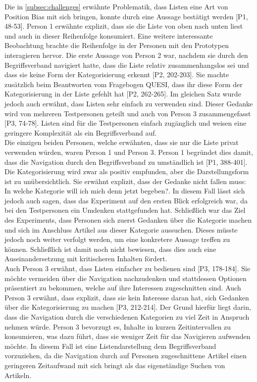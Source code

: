 Die in \autoref{subsec:challenges} erwähnte Problematik, dass Listen eine Art von Position Bias mit sich bringen, konnte durch eine Aussage bestätigt werden [P1, 48-53].
Person 1 erwähnte explizit, dass sie die Liste von oben nach unten liest und auch in dieser Reihenfolge konsumiert.
Eine weitere interessante Beobachtung brachte die Reihenfolge in der Personen mit den Prototypen interagieren hervor.
Die erste Aussage von Person 2 war, nachdem sie durch den Begriffsverband navigiert hatte, dass die Liste \glqq relativ zusammenhangslos\grqq{} sei und dass sie keine Form der Kategorisierung erkennt [P2, 202-203].
Sie machte zusätzlich beim Beantworten vom Fragebogen \ac{QUESI}, dass ihr diese Form der Kategorisierung in der Liste gefehlt hat [P2, 262-265].
Im gleichen Satz wurde jedoch auch erwähnt, dass Listen sehr einfach zu verwenden sind.
Dieser Gedanke wird von mehreren Testpersonen geteilt und auch von Person 3 zusammengefasst [P3, 74-78].
Listen sind für die Testpersonen einfach zugänglich und weisen eine geringere Komplexität als ein Begriffsverband auf.\\

Die einzigen beiden Personen, welche erwähnten, dass sie nur die Liste privat verwenden würden, waren Person 1 und Person 3.
Person 1 begründet dies damit, dass die Navigation durch den Begriffsverband zu umständlich ist [P1, 388-401].
Die Kategorisierung wird zwar als positiv empfunden, aber die Darstellungsform ist zu unübersichtlich.
Sie erwähnt explizit, dass der Gedanke nicht fallen muss: \glqq In welche Kategorie will ich mich denn jetzt begeben?\grqq{}.
In diesem Fall lässt sich jedoch auch sagen, dass das Experiment auf den ersten Blick erfolgreich war, da bei den Testpersonen ein Umdenken stattgefunden hat.
Schließlich war das Ziel des Experiments, dass Personen sich zuerst Gedanken über die Kategorie machen und sich im Anschluss Artikel aus dieser Kategorie aussuchen.
Dieses müsste jedoch noch weiter verfolgt werden, um eine konkretere Aussage treffen zu können.
Schließlich ist damit noch nicht bewiesen, dass dies auch eine Auseinandersetzung mit kritischeren Inhalten fördert.\\

Auch Person 3 erwähnt, dass Listen einfacher zu bedienen sind [P3, 178-184].
Sie möchte vermeiden über die Navigation nachzudenken und stattdessen Optionen präsentiert zu bekommen, welche auf ihre Interessen zugeschnitten sind.
Auch Person 3 erwähnt, dass explizit, dass sie kein Interesse daran hat, sich Gedanken über die Kategorisierung zu machen [P3, 212-214].
Der Grund hierfür liegt darin, dass die Navigation durch die verschiedenen Kategorien zu viel Zeit in Anspruch nehmen würde.
Person 3 bevorzugt es, Inhalte in kurzen Zeitintervallen zu konsumieren, was dazu führt, dass sie weniger Zeit für das Navigieren aufwenden möchte.
In diesem Fall ist eine Listendarstellung dem Begriffsverband vorzuziehen, da die Navigation durch auf Personen zugeschnittene Artikel einen geringeren Zeitaufwand mit sich bringt als das eigenständige Suchen von Artikeln.


